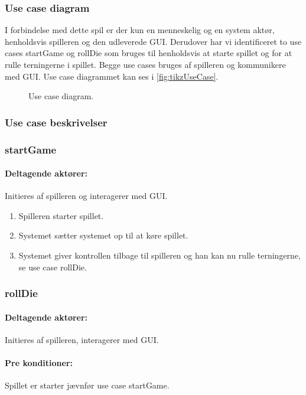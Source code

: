 \subsubsection{Use case diagram}
I forbindelse med dette spil er der kun en menneskelig og en system aktør, henholdsvis spilleren og den udleverede GUI. Derudover har vi identificeret to use cases startGame og rollDie som bruges til henholdsvis at starte spillet og for at rulle terningerne i spillet. Begge use cases bruges af spilleren og kommunikere med GUI. Use case diagrammet kan ses i \vref{fig:tikzUseCase}.

\begin{figure}
\caption{Use case diagram.}\label{fig:tikzUseCase}
\centering

\end{figure}

\subsubsection{Use case beskrivelser}

\subsubsection{startGame}

\paragraph{Deltagende aktører:} Initieres af spilleren og interagerer med GUI.

\begin{enumerate}
\item Spilleren starter spillet.
\item Systemet sætter systemet op til at køre spillet.
\item Systemet giver kontrollen tilbage til spilleren og han kan nu rulle terningerne, se use case rollDie.
\end{enumerate}

\subsubsection{rollDie}
\paragraph{Deltagende aktører:} Initieres af spilleren, interagerer med GUI.

\paragraph{Pre konditioner:} Spillet er starter jævnfør use case startGame.

